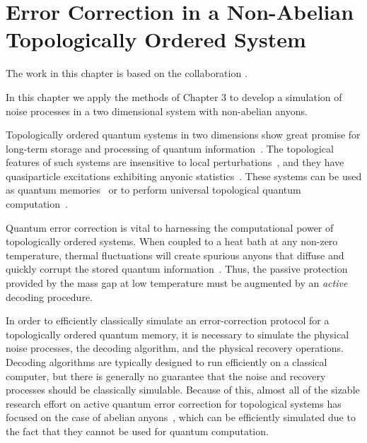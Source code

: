 
\chapter{Error Correction in a Non-Abelian Topologically Ordered System}

The work in this chapter is based on the collaboration \cite{Burton2015}.

In this chapter we apply the methods of Chapter 3 
to develop a simulation of noise processes in a two dimensional
system with non-abelian anyons.

Topologically ordered quantum systems in two dimensions show great promise for 
long-term storage and processing of 
quantum information~\cite{Kitaev2003, Dennis2002, Nayak2008}. 
The topological features of such systems are insensitive to local 
perturbations~\cite{Bravyi2010, Bravyi2011a, Michalakis2013}, and they
have quasiparticle excitations exhibiting anyonic
statistics~\cite{Wilczek1990}. These systems can be used as
quantum memories~\cite{Kitaev2003, Dennis2002} or to
perform universal topological
quantum computation~\cite{Freedman2002, Nayak2008}.

Quantum error correction is vital
to harnessing the computational power of topologically
ordered systems. When coupled to
a heat bath at any non-zero temperature, thermal fluctuations
will create spurious anyons that diffuse and quickly corrupt the stored quantum 
information~\cite{Pastawski2010}. Thus, the passive protection provided by the mass gap
at low temperature must be augmented by an \emph{active} decoding procedure. 

In order to efficiently classically simulate an error-correction protocol for
a topologically ordered quantum memory, it is necessary to simulate  
the physical noise processes, the decoding algorithm, and the physical recovery operations.
Decoding algorithms are typically designed to run efficiently on a 
classical computer, but there is generally no guarantee that the  
noise and recovery processes should be classically simulable.
Because of this, almost all of the sizable research effort 
on active quantum error correction for topological systems has focused
on the case of abelian
anyons~\cite{Dennis2002, Duclos-Cianci2010, Duclos-Cianci2010a, Wang2010, Wang2010a,
Duclos-Cianci2013, Bravyi2011, Bombin2012, Wootton2012, Anwar2014,
Watson2014, Hutter2014a, Bravyi2014, Wootton2015, Fowler2015,
Andrist2015}, which can be efficiently
simulated due to the fact that they cannot be used for quantum computation.

